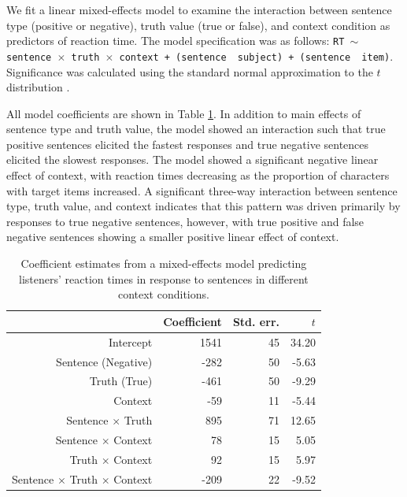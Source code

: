 \documentclass[man, noapacite]{apa2}
\begin{document}
We fit a linear mixed-effects model to examine the interaction between sentence type (positive or negative), truth value (true or false), and context condition as predictors of reaction time. The model specification was as follows: \texttt{RT $\sim$ sentence~$\times$~truth~$\times$~context + (sentence~\textbar~subject) +  (sentence~\textbar~item)}.  Significance was calculated using the standard normal approximation to the $t$ distribution \cite{barr2013}.

All model coefficients are shown in Table \ref{tab:listenermodel}. In addition to main effects of sentence type and truth value, the model showed an interaction such that true positive sentences elicited the fastest responses and true negative sentences elicited the slowest responses. The model showed a significant negative linear effect of context, with reaction times decreasing as the proportion of characters with target items increased. A significant three-way interaction between sentence type, truth value, and context indicates that this pattern was driven primarily by responses to true negative sentences, however, with true positive and false negative sentences showing a smaller positive linear effect of context.  

\begin{table}[t]
\caption{\label{tab:listenermodel} Coefficient estimates from a mixed-effects model predicting listeners' reaction times in response to sentences in different context conditions.}
\begin{center}
\begin{tabular}{rrrr}
  \hline
 & Coefficient & Std. err. & $t$ \\ 
  \hline
Intercept & 1541 & 45 & 34.20 \\ 
  Sentence (Negative) & -282 & 50 & -5.63  \\ 
  Truth (True) & -461 & 50 & -9.29 \\
  Context & -59 & 11 & -5.44 \\ 
  Sentence $\times$ Truth & 895 & 71 & 12.65 \\
  Sentence $\times$ Context & 78 & 15 & 5.05 \\
  Truth $\times$ Context & 92 & 15 & 5.97 \\
  Sentence $\times$ Truth $\times$ Context & -209 & 22 & -9.52 \\
   \hline
\end{tabular}
\vspace{-1.5cm}
\end{center}
\end{table}
\end{document}
